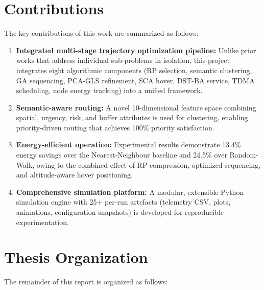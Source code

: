\documentclass[12pt, a4paper, oneside]{report}
\begin{document}
\section{Contributions}

The key contributions of this work are summarized as follows:

\begin{enumerate}
    \item \textbf{Integrated multi-stage trajectory optimization pipeline:} Unlike prior works that address individual sub-problems in isolation, this project integrates eight algorithmic components (RP selection, semantic clustering, GA sequencing, PCA-GLS refinement, SCA hover, DST-BA service, TDMA scheduling, node energy tracking) into a unified framework.

    \item \textbf{Semantic-aware routing:} A novel 10-dimensional feature space combining spatial, urgency, risk, and buffer attributes is used for clustering, enabling priority-driven routing that achieves 100\% priority satisfaction.

    \item \textbf{Energy-efficient operation:} Experimental results demonstrate 13.4\% energy savings over the Nearest-Neighbour baseline and 24.5\% over Random-Walk, owing to the combined effect of RP compression, optimized sequencing, and altitude-aware hover positioning.

    \item \textbf{Comprehensive simulation platform:} A modular, extensible Python simulation engine with 25+ per-run artefacts (telemetry CSV, plots, animations, configuration snapshots) is developed for reproducible experimentation.
\end{enumerate}

\section{Thesis Organization}

The remainder of this report is organized as follows:
\end{document}
